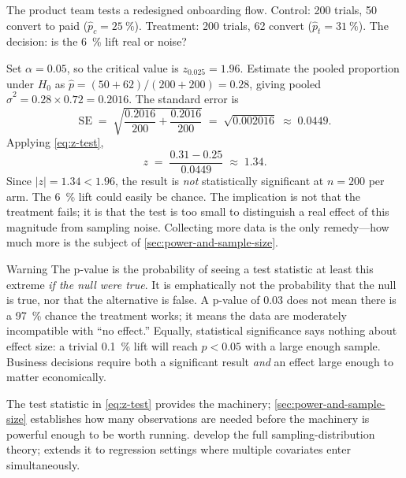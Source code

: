 \begin{example}
The product team tests a redesigned onboarding flow. Control: \num{200} trials, \num{50}
convert to paid (\(\hat{p}_c = \qty{25}{\percent}\)). Treatment: \num{200} trials, \num{62}
convert (\(\hat{p}_t = \qty{31}{\percent}\)). The decision: is the \qty{6}{\percent} lift
real or noise?

Set \(\alpha=0.05\), so the critical value is \(z_{0.025}=1.96\). Estimate the pooled
proportion under \(H_0\) as \(\hat{p} = (50+62)/(200+200) = 0.28\), giving pooled
\(\hat{\sigma}^2 = 0.28 \times 0.72 = 0.2016\). The standard error is
\[
  \mathrm{SE} \;=\; \sqrt{\frac{0.2016}{200}+\frac{0.2016}{200}}
               \;=\; \sqrt{0.002016}
               \;\approx\; 0.0449.
\]
Applying \cref{eq:z-test},
\[
  z \;=\; \frac{0.31 - 0.25}{0.0449} \;\approx\; 1.34.
\]
Since \(|z|=1.34 < 1.96\), the result is \emph{not} statistically significant at \(n=200\)
per arm. The \qty{6}{\percent} lift could easily be chance. The implication is not that the
treatment fails; it is that the test is too small to distinguish a real effect of this
magnitude from sampling noise. Collecting more data is the only remedy---how much more is
the subject of \cref{sec:power-and-sample-size}.
\end{example}

\begin{admonition}{Warning}
The p-value is the probability of seeing a test statistic at least this extreme \emph{if the
null were true}. It is emphatically not the probability that the null is true, nor that the
alternative is false. A p-value of \num{0.03} does not mean there is a \qty{97}{\percent}
chance the treatment works; it means the data are moderately incompatible with ``no effect.''
Equally, statistical significance says nothing about effect size: a trivial \qty{0.1}{\percent}
lift will reach \(p<0.05\) with a large enough sample. Business decisions require both a
significant result \emph{and} an effect large enough to matter economically.
\end{admonition}

The test statistic in \cref{eq:z-test} provides the machinery; \cref{sec:power-and-sample-size}
establishes how many observations are needed before the machinery is powerful enough to be
worth running. \textcite{anderson2019statistics} develop the full sampling-distribution
theory; \textcite{wooldridge2020introductory} extends it to regression settings where
multiple covariates enter simultaneously.



